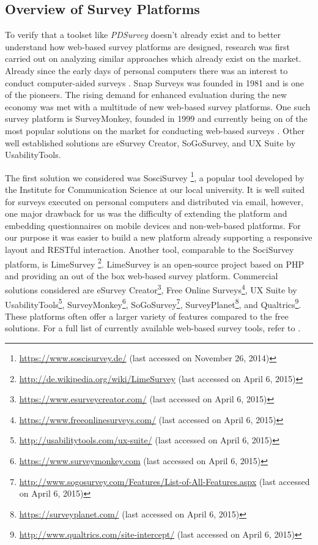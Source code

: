 





	\subsection{Overview of Survey Platforms}
	To verify that a toolset like \textit{PDSurvey} doesn't already exist and to better understand how web-based survey platforms are designed, research was first carried out on analyzing similar approaches which already exist on the market. Already since the early days of personal computers there was an interest to conduct computer-aided surveys \cite{SnapSurveys2015AboutUs}. Snap Surveys was founded in 1981 and is one of the pioneers. The rising demand for enhanced evaluation during the new economy was met with a multitude of new web-based survey platforms. One such survey platform is SurveyMonkey, founded in 1999 and currently being on of the most popular solutions on the market for conducting web-based surveys \cite{SurveyMonkeyAboutUs}. Other well established solutions are eSurvey Creator, SoGoSurvey, and UX Suite by UsabilityTools.

	The first solution we considered was SosciSurvey \footnote{\url{https://www.soscisurvey.de/} (last accessed on November 26, 2014)}, a popular tool developed by the Institute for Communication Science at our local university. It is well suited for surveys executed on personal computers and distributed via email, however, one major drawback for us was the difficulty of extending the platform and embedding questionnaires on mobile devices and non-web-based platforms. For our purpose it was easier to build a new platform already supporting a responsive layout and RESTful interaction. Another tool, comparable to the SociSurvey platform, is LimeSurvey \footnote{\url{http://de.wikipedia.org/wiki/LimeSurvey} (last accessed on April 6, 2015)}. LimeSurvey is an open-source project based on PHP and providing an out of the box web-based survey platform.
	Commercial solutions considered are eSurvey Creator\footnote{\url{https://www.esurveycreator.com/} (last accessed on April 6, 2015)}, Free Online Surveys\footnote{\url{https://www.freeonlinesurveys.com/} (last accessed on April 6, 2015)}, UX Suite by UsabilityTools\footnote{\url{http://usabilitytools.com/ux-suite/} (last accessed on April 6, 2015)}, SurveyMonkey\footnote{\url{https://www.surveymonkey.com} (last accessed on April 6, 2015)}, SoGoSurvey\footnote{\url{http://www.sogosurvey.com/Features/List-of-All-Features.aspx} (last accessed on April 6, 2015)}, SurveyPlanet\footnote{\url{https://surveyplanet.com/} (last accessed on April 6, 2015)}, and Qualtrics\footnote{\url{http://www.qualtrics.com/site-intercept/} (last accessed on April 6, 2015)}. These platforms often offer a larger variety of features compared to the free solutions. For a full list of currently available web-based survey tools, refer to \cite{Capterra2015SurveyTools, Idealware2011SurveyTools}.

